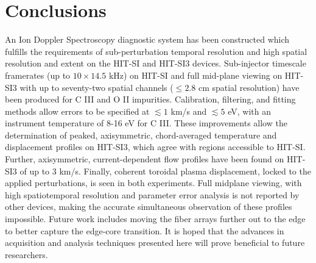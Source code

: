 \section{Conclusions}
\hspace{4ex}An Ion Doppler Spectroscopy diagnostic system has been constructed which fulfills the requirements of sub-perturbation temporal resolution and high spatial resolution and extent on the HIT-SI and HIT-SI3 devices. Sub-injector timescale framerates (up to $10\times{14.5}$ kHz) on HIT-SI and full mid-plane viewing on HIT-SI3 with up to seventy-two spatial channels ($\leq2.8$ cm spatial resolution) have been produced for C III and O II impurities. Calibration, filtering, and fitting methods allow errors to be specified at $\lesssim1$ km/s and $\lesssim5$ eV, with an instrument temperature of 8-16 eV for C III. These improvements allow the determination of peaked, axisymmetric, chord-averaged temperature and displacement profiles on HIT-SI3, which agree with regions accessible to HIT-SI. Further, axisymmetric, current-dependent flow profiles have been found on HIT-SI3 of up to 3 km/s. Finally, coherent toroidal plasma displacement, locked to the applied perturbations, is seen in both experiments. Full midplane viewing, with high spatiotemporal resolution and parameter error analysis is not reported by other devices, making the accurate simultaneous observation of these profiles impossible. Future work includes moving the fiber arrays further out to the edge to better capture the edge-core transition. It is hoped that the advances in acquisition and analysis techniques presented here will prove beneficial to future researchers. 


